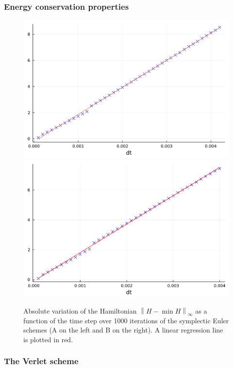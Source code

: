     \subsubsection{Energy conservation properties}
    \begin{figure}[htbp]
        \begin{center}
          \includegraphics[width=0.49\linewidth]{figures/chapter1/energy_fluctuations_SEA.pdf}
          \includegraphics[width=0.49\linewidth]{figures/chapter1/energy_fluctuations_SEB.pdf}
          \caption{ \label{fig:energy_symplectic_euler}
            Absolute variation of the Hamiltonian $ \left\lVert H-\operatorname{min} H\right\rVert_{\infty}$ as a function of the time step over 1000 iterations of the symplectic Euler schemes (A on the left and B on the right). A linear regression line is plotted in red.
          }
        \end{center}
      \end{figure}

    \subsubsection{The Verlet scheme}

